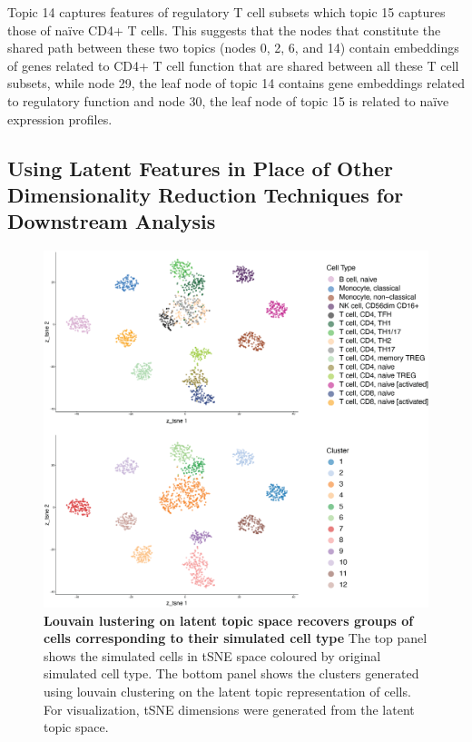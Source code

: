 Topic 14 captures features of regulatory T cell subsets which topic 15 captures those of naïve CD4+ T cells. This suggests that the nodes that constitute the shared path between these two topics (nodes 0, 2, 6, and 14) contain embeddings of genes related to CD4+ T cell function that are shared between all these T cell subsets, while node 29, the leaf node of topic 14 contains gene embeddings related to regulatory function and node 30, the leaf node of topic 15 is related to naïve expression profiles. 



\subsection{Using Latent Features in Place of Other Dimensionality Reduction Techniques for Downstream Analysis}
\begin{figure}
    \centering
    \includegraphics[width=\textwidth]{Figures/cluster_tsne.png}
    \caption{\textbf{Louvain lustering on latent topic space recovers groups of cells corresponding to their simulated cell type} The top panel shows the simulated cells in tSNE space coloured by original simulated cell type. The bottom panel shows the clusters generated using louvain clustering on the latent topic representation of cells. For visualization, tSNE dimensions were generated from the latent topic space.}
    \label{fig:sim_clusters}
\end{figure}

